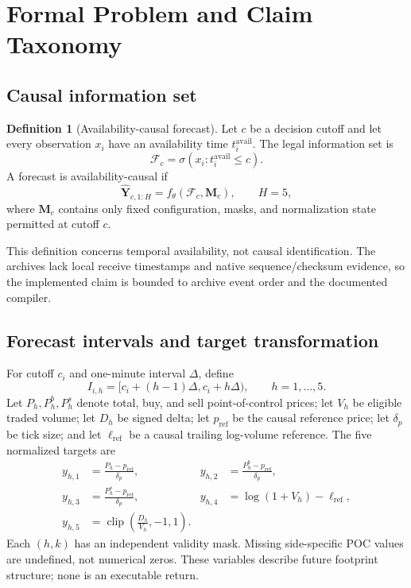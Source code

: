 \documentclass[10pt,letterpaper]{article}
\numberwithin{equation}{section}
\theoremstyle{definition}
\newtheorem{definition}{Definition}
\theoremstyle{remark}
\begin{document}
\section{Formal Problem and Claim Taxonomy}

\subsection{Causal information set}

\begin{definition}[Availability-causal forecast]
Let \(c\) be a decision cutoff and let every observation \(x_i\) have an
availability time \(t_i^{\mathrm{avail}}\). The legal information set is
\begin{equation}
\mathcal{F}_c =
\sigma\!\left(x_i:t_i^{\mathrm{avail}}\leq c\right).
\label{eq:filtration}
\end{equation}
A forecast is availability-causal if
\begin{equation}
\widehat{\mathbf{Y}}_{c,1:H}
= f_{\theta}\!\left(\mathcal{F}_c,\mathbf{M}_c\right),\qquad H=5,
\label{eq:forecast-map}
\end{equation}
where \(\mathbf{M}_c\) contains only fixed configuration, masks, and
normalization state permitted at cutoff \(c\).
\end{definition}

This definition concerns temporal availability, not causal identification.
The archives lack local receive timestamps and native sequence/checksum
evidence, so the implemented claim is bounded to archive event order and the
documented compiler.

\subsection{Forecast intervals and target transformation}

For cutoff \(c_i\) and one-minute interval \(\Delta\), define
\begin{equation}
I_{i,h}=[c_i+(h-1)\Delta,c_i+h\Delta),\qquad h=1,\ldots,5.
\label{eq:target-interval}
\end{equation}
Let \(P_h,P_h^{b},P_h^{s}\) denote total, buy, and sell point-of-control
prices; let \(V_h\) be eligible traded volume; let \(D_h\) be signed delta; let
\(p_{\mathrm{ref}}\) be the causal reference price; let \(\delta_p\) be tick
size; and let \(\ell_{\mathrm{ref}}\) be a causal trailing log-volume
reference. The five normalized targets are
\begin{align}
y_{h,1} &= \frac{P_h-p_{\mathrm{ref}}}{\delta_p}, &
y_{h,2} &= \frac{P_h^{b}-p_{\mathrm{ref}}}{\delta_p}, \nonumber\\
y_{h,3} &= \frac{P_h^{s}-p_{\mathrm{ref}}}{\delta_p}, &
y_{h,4} &= \log(1+V_h)-\ell_{\mathrm{ref}}, \label{eq:targets}\\
y_{h,5} &= \operatorname{clip}\!\left(\frac{D_h}{V_h},-1,1\right).
\nonumber
\end{align}
Each \((h,k)\) has an independent validity mask. Missing side-specific POC
values are undefined, not numerical zeros. These variables describe future
footprint structure; none is an executable return.
\end{document}
